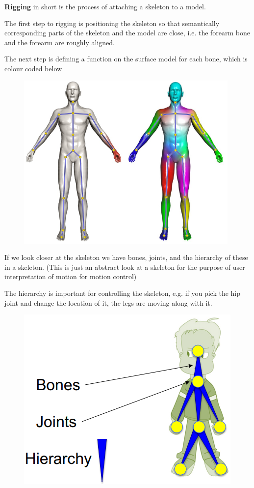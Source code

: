 \documentclass{article}
\begin{document}
\textbf{Rigging} in short is the process of attaching a skeleton to a model.

\vspace{10px}

The first step to rigging is positioning the skeleton so that semantically corresponding parts of the skeleton
and the model are close, i.e. the forearm bone and the forearm are roughly aligned.

\vspace{5px}

The next step is defining a function on the surface model for each bone, which is colour coded below

\begin{figure}[!ht]
    \centering
    \includegraphics[width=0.5\linewidth]{images/skeleton_coloured.png}
\end{figure}


If we look closer at the skeleton we have bones, joints, and the hierarchy of these in a skeleton.
(This is just an abstract look at a skeleton for the purpose of user interpretation of motion for motion
control)

\vspace{5px}

The hierarchy is important for controlling the skeleton, e.g. if you pick the hip joint and change the 
location of it, the legs are moving along with it.

\begin{figure}[!ht]
    \centering
    \includegraphics[width=0.3\linewidth]{images/skeleton_hierarchy.png}
\end{figure}
\end{document}
